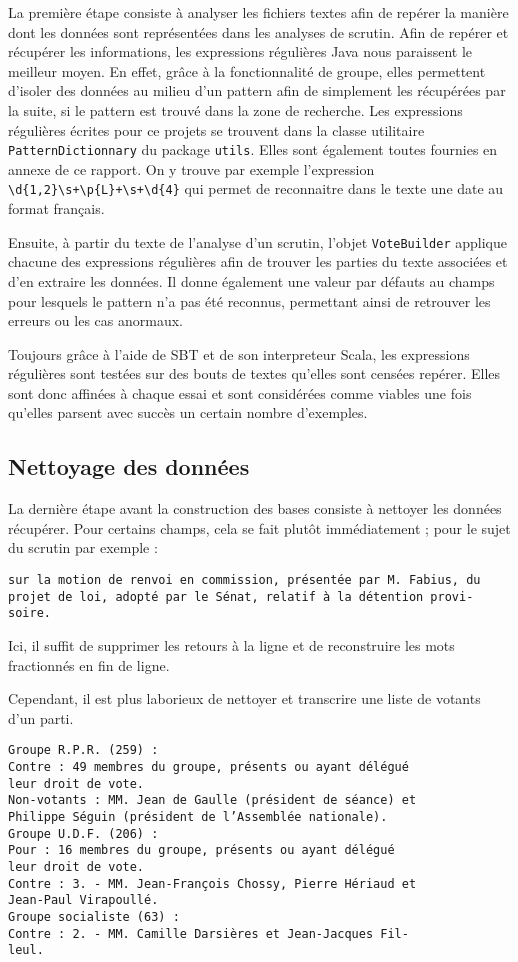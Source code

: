 La première étape consiste à analyser les fichiers textes afin de repérer la manière dont les données sont représentées dans les analyses de scrutin. Afin de repérer et récupérer les informations, les expressions régulières Java nous paraissent le meilleur moyen. En effet, grâce à la fonctionnalité de groupe, elles permettent d'isoler des données au milieu d'un pattern afin de simplement les récupérées par la suite, si le pattern est trouvé dans la zone de recherche. Les expressions régulières écrites pour ce projets se trouvent dans la classe utilitaire \verb|PatternDictionnary| du package \verb|utils|. Elles sont également toutes fournies en annexe de ce rapport. On y trouve par exemple l'expression \verb|\d{1,2}\s+\p{L}+\s+\d{4}| qui permet de reconnaitre dans le texte une date au format français.

Ensuite, à partir du texte de l'analyse d'un scrutin, l'objet \verb|VoteBuilder| applique chacune des expressions régulières afin de trouver les parties du texte associées et d'en extraire les données. Il donne également une valeur par défauts au champs pour lesquels le pattern n'a pas été reconnus, permettant ainsi de retrouver les erreurs ou les cas anormaux.

Toujours grâce à l'aide de SBT et de son interpreteur Scala, les expressions régulières sont testées sur des bouts de textes qu'elles sont censées repérer. Elles sont donc affinées à chaque essai et sont considérées comme viables une fois qu'elles parsent avec succès un certain nombre d'exemples.

\subsection{Nettoyage des données}

La dernière étape avant la construction des bases consiste à nettoyer les données récupérer. Pour certains champs, cela se fait plutôt immédiatement ; pour le sujet du scrutin par exemple :
\begin{verbatim}
sur la motion de renvoi en commission, présentée par M. Fabius, du
projet de loi, adopté par le Sénat, relatif à la détention provi-
soire.
\end{verbatim}
Ici, il suffit de supprimer les retours à la ligne et de reconstruire les mots fractionnés en fin de ligne.

Cependant, il est plus laborieux de nettoyer et transcrire une liste de votants d'un parti.
\begin{verbatim}
Groupe R.P.R. (259) :
Contre : 49 membres du groupe, présents ou ayant délégué
leur droit de vote.
Non-votants : MM. Jean de Gaulle (président de séance) et
Philippe Séguin (président de l’Assemblée nationale).
Groupe U.D.F. (206) :
Pour : 16 membres du groupe, présents ou ayant délégué
leur droit de vote.
Contre : 3. - MM. Jean-François Chossy, Pierre Hériaud et
Jean-Paul Virapoullé.
Groupe socialiste (63) :
Contre : 2. - MM. Camille Darsières et Jean-Jacques Fil-
leul.
\end{verbatim}

